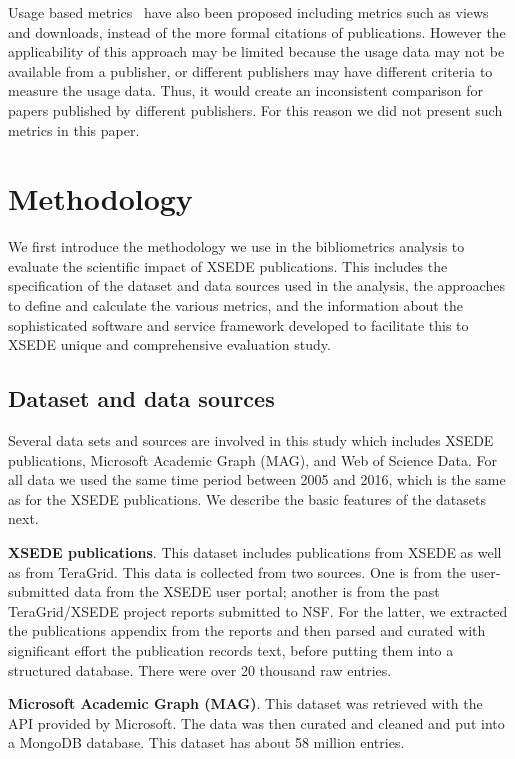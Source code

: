 \documentclass{sig-alternate}
\begin{document}
Usage based
metrics~\cite{Bollen:2007:MUM:1255175.1255273,Bollen:2008:TUI:1378889.1378928}
have also been proposed including metrics such as views and downloads,
instead of the more formal citations of publications. However the
applicability of this approach may be limited because the usage data
may not be available from a publisher, or different publishers may
have different criteria to measure the usage data. Thus, it would
create an inconsistent comparison for papers published by different
publishers.  For this reason we did not present such metrics in this
paper.

\section{Methodology} \label{S:methodology}

We first introduce the methodology we use in the bibliometrics
analysis to evaluate the scientific impact of XSEDE publications. This
includes the specification of the dataset and data sources used in the
analysis, the approaches to define and calculate the various metrics,
and the information about the sophisticated software and service
framework developed to facilitate this to XSEDE unique and
comprehensive evaluation study.

\subsection{Dataset and data sources}

Several data sets and sources are involved in this study which
includes XSEDE publications, Microsoft Academic Graph (MAG), and Web
of Science Data. For all data we used the same time period between
2005 and 2016, which is the same as for the XSEDE publications. We
describe the basic features of the datasets next.

\parindent 0pt \textbf{XSEDE publications}. This dataset includes
publications from XSEDE as well as from TeraGrid.  This data is
collected from two sources. One is from the user-submitted data from
the XSEDE user portal; another is from the past TeraGrid/XSEDE project
reports submitted to NSF. For the latter, we extracted the
publications appendix from the reports and then parsed and curated
with significant effort the publication records text, before putting
them into a structured database. There were over 20 thousand raw
entries.

\parindent 0pt \textbf{Microsoft Academic Graph (MAG)}. This dataset
was retrieved with the API provided by Microsoft. The data was then
curated and cleaned and put into a MongoDB database. This dataset has
about 58 million entries.
\end{document}
